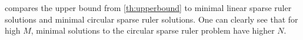 \documentclass[a4paper, openany, oneside]{memoir}
\begin{document}
 compares the upper bound from \cref{th:upperbound} to minimal linear sparse ruler solutions and minimal circular sparse ruler solutions. One can clearly see that for high $M$, minimal solutions to the circular sparse ruler problem have higher $N$.
    

\end{document}
